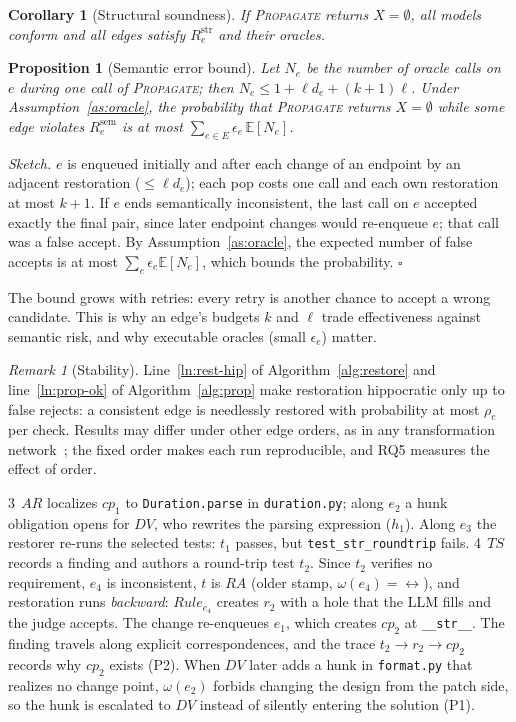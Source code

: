 \documentclass[10pt, anonymous, conference]{IEEEtran}
\theoremstyle{definition}
\theoremstyle{plain}
\newtheorem{proposition}{Proposition}[section]
\newtheorem{corollary}{Corollary}[section]
\theoremstyle{remark}
\newtheorem{remark}{Remark}[section]
\newcommand{\str}{\mathrm{str}}
\newcommand{\sem}{\mathrm{sem}}
\newcommand{\code}[1]{\texttt{#1}}
\newcommand{\step}[1]{\textcircled{\scriptsize #1}}
\begin{document}
\begin{corollary}[Structural soundness]\label{cor:sound}
If \textsc{Propagate} returns $X=\emptyset$, all models conform and all edges
satisfy $R_e^{\str}$ and their oracles.
\end{corollary}

\begin{proposition}[Semantic error bound]\label{prop:sem}
Let $N_e$ be the number of oracle calls on $e$ during one call of
\textsc{Propagate}; then $N_e\le 1+\ell d_e+(k+1)\ell$. Under
Assumption~\ref{as:oracle}, the probability that \textsc{Propagate} returns
$X=\emptyset$ while some edge violates $R_e^{\sem}$ is at most
$\sum_{e\in E}\epsilon_e\,\mathbb{E}[N_e]$.
\end{proposition}
\noindent\emph{Sketch.} $e$ is enqueued initially and after each change of an
endpoint by an adjacent restoration ($\le\ell d_e$); each pop costs one call
and each own restoration at most $k{+}1$. If $e$ ends semantically
inconsistent, the last call on $e$ accepted exactly the final pair, since
later endpoint changes would re-enqueue $e$; that call was a false accept. By
Assumption~\ref{as:oracle}, the expected number of false accepts is at most
$\sum_e\epsilon_e\mathbb{E}[N_e]$, which bounds the probability.
\hfill$\square$

The bound grows with retries: every retry is another chance to accept a wrong
candidate. This is why an edge's budgets $k$ and $\ell$ trade effectiveness
against semantic risk, and why executable oracles (small $\epsilon_e$) matter.

\begin{remark}[Stability]
Line~\ref{ln:rest-hip} of Algorithm~\ref{alg:restore} and
line~\ref{ln:prop-ok} of Algorithm~\ref{alg:prop} make restoration hippocratic
only up to false rejects: a consistent edge is needlessly restored with
probability at most $\rho_e$ per check. Results may differ under other edge
orders, as in any transformation network~\cite{stevens2020networks}; the fixed
order makes each run reproducible, and RQ5 measures the effect of order.
\end{remark}

\smallskip\noindent\step{3}\,$\mathit{AR}$ localizes $cp_1$ to
\code{Duration.parse} in \code{duration.py}; along $e_2$ a hunk obligation opens for
$\mathit{DV}$, who rewrites the parsing expression ($h_1$). Along $e_3$ the
restorer re-runs the selected tests: $t_1$ passes, but
\code{test\_str\_roundtrip} fails.
\step{4}\,$\mathit{TS}$ records a finding and authors a round-trip test $t_2$.
Since $t_2$ verifies no requirement, $e_4$ is inconsistent, $t$ is
$\mathit{RA}$ (older stamp, $\omega(e_4)={\leftrightarrow}$), and restoration
runs \emph{backward}: $\mathit{Rule}_{e_4}$ creates $r_2$ with a hole that the
LLM fills and the judge accepts. The change re-enqueues $e_1$, which creates
$cp_2$ at \code{\_\_str\_\_}. The finding travels along explicit
correspondences, and the trace $t_2\to r_2\to cp_2$ records why $cp_2$ exists
(P2). When $\mathit{DV}$ later adds a hunk in \code{format.py} that realizes no
change point, $\omega(e_2)$ forbids changing the design from the patch side,
so the hunk is escalated to $\mathit{DV}$ instead of silently entering the
solution (P1).
\end{document}
